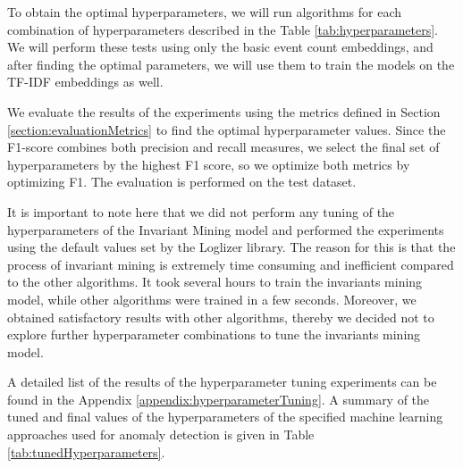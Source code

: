 
To obtain the optimal hyperparameters, we will run algorithms for each combination of hyperparameters described in the Table \ref{tab:hyperparameters}. We will perform these tests using only the basic event count embeddings, and after finding the optimal parameters, we will use them to train the models on the TF-IDF embeddings as well.

We evaluate the results of the experiments using the metrics defined in Section \ref{section:evaluationMetrics} to find the optimal hyperparameter values. Since the F1-score combines both precision and recall measures, we select the final set of hyperparameters by the highest F1 score, so we optimize both metrics by optimizing F1. The evaluation is performed on the test dataset. 

It is important to note here that we did not perform any tuning of the hyperparameters of the Invariant Mining model and performed the experiments using the default values set by the Loglizer library. The reason for this is that the process of invariant mining is extremely time consuming and inefficient compared to the other algorithms. It took several hours to train the invariants mining model, while other algorithms were trained in a few seconds. Moreover, we obtained satisfactory results with other algorithms, thereby we decided not to explore further hyperparameter combinations to tune the invariants mining model.

A detailed list of the results of the hyperparameter tuning experiments can be found in the Appendix \ref{appendix:hyperparameterTuning}. A summary of the tuned and final values of the hyperparameters of the specified machine learning approaches used for anomaly detection is given in Table \ref{tab:tunedHyperparameters}. 

